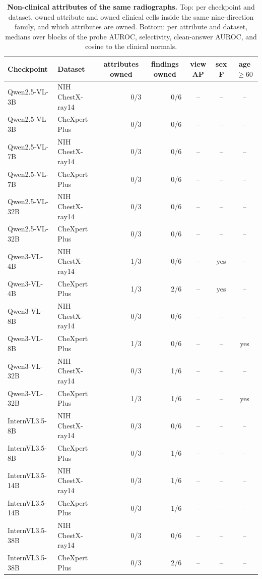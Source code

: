 \documentclass{article}
\begin{document}
\begin{table}[htbp]
\centering
\scriptsize
\setlength{\tabcolsep}{4pt}
\caption{\textbf{Non-clinical attributes of the same radiographs.} Top: per checkpoint and dataset, owned attribute and owned clinical cells inside the same nine-direction family, and which attributes are owned. Bottom: per attribute and dataset, medians over blocks of the probe AUROC, selectivity, clean-answer AUROC, and cosine to the clinical normals.}
\label{tab:cf-attr}
\begin{tabular}{llrrccc}
\toprule
Checkpoint & Dataset & \multicolumn{1}{c}{attributes owned} & \multicolumn{1}{c}{findings owned} & \multicolumn{1}{c}{view AP} & \multicolumn{1}{c}{sex F} & \multicolumn{1}{c}{age $\geq60$}\\
\midrule
Qwen2.5-VL-3B & NIH ChestX-ray14 & 0/3 & 0/6 & -- & -- & -- \\
Qwen2.5-VL-3B & CheXpert Plus & 0/3 & 0/6 & -- & -- & -- \\
Qwen2.5-VL-7B & NIH ChestX-ray14 & 0/3 & 0/6 & -- & -- & -- \\
Qwen2.5-VL-7B & CheXpert Plus & 0/3 & 0/6 & -- & -- & -- \\
Qwen2.5-VL-32B & NIH ChestX-ray14 & 0/3 & 0/6 & -- & -- & -- \\
Qwen2.5-VL-32B & CheXpert Plus & 0/3 & 0/6 & -- & -- & -- \\
Qwen3-VL-4B & NIH ChestX-ray14 & 1/3 & 0/6 & -- & yes & -- \\
Qwen3-VL-4B & CheXpert Plus & 1/3 & 2/6 & -- & yes & -- \\
Qwen3-VL-8B & NIH ChestX-ray14 & 0/3 & 0/6 & -- & -- & -- \\
Qwen3-VL-8B & CheXpert Plus & 1/3 & 0/6 & -- & -- & yes \\
Qwen3-VL-32B & NIH ChestX-ray14 & 0/3 & 1/6 & -- & -- & -- \\
Qwen3-VL-32B & CheXpert Plus & 1/3 & 1/6 & -- & -- & yes \\
InternVL3.5-8B & NIH ChestX-ray14 & 0/3 & 0/6 & -- & -- & -- \\
InternVL3.5-8B & CheXpert Plus & 0/3 & 1/6 & -- & -- & -- \\
InternVL3.5-14B & NIH ChestX-ray14 & 0/3 & 1/6 & -- & -- & -- \\
InternVL3.5-14B & CheXpert Plus & 0/3 & 1/6 & -- & -- & -- \\
InternVL3.5-38B & NIH ChestX-ray14 & 0/3 & 0/6 & -- & -- & -- \\
InternVL3.5-38B & CheXpert Plus & 0/3 & 2/6 & -- & -- & -- \\

\end{tabular}
\end{table}
\end{document}

